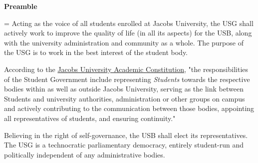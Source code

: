 \begin{center}
\textbf{Preamble}
\end{center}

{\parskip=\baselineskip
Acting as the voice of all students enrolled at Jacobs University, the \acf{USG} shall actively work to improve the quality of life (in all its aspects) for the \acf{USB}, along with the university administration and community as a whole. The purpose of the \acf{USG} is to work in the best interest of the student body.

According to the \href{https://usg.jacobs.university/wp-content/uploads/2018/02/Academic_Constitution_2017_english.pdf}{Jacobs University Academic Constitution}, "the responsibilities of the Student Government include representing \textit{Students} towards the respective bodies within as well as outside Jacobs University, serving as the link between Students and university authorities, administration or other groups on campus and actively contributing to the communication between those bodies, appointing all representatives of students, and ensuring continuity."


Believing in the right of self-governance, the \acf{USB} shall elect its representatives. The \acf{USG} is a technocratic parliamentary democracy, entirely student-run and politically independent of any administrative bodies. 
}